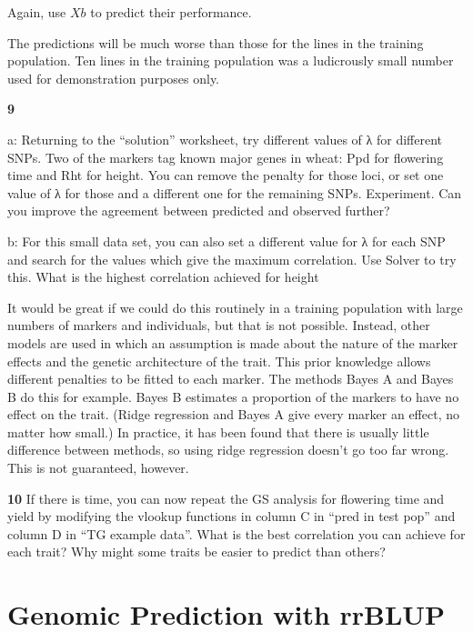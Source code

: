 \documentclass[
]{book}
\makeatletter
\newenvironment{kframe}{%
\medskip{}
\setlength{\fboxsep}{.8em}
 \def\at@end@of@kframe{}%
 \ifinner\ifhmode%
  \def\at@end@of@kframe{\end{minipage}}%
  \begin{minipage}{\columnwidth}%
 \fi\fi%
 \def\FrameCommand##1{\hskip\@totalleftmargin \hskip-\fboxsep
 \colorbox{shadecolor}{##1}\hskip-\fboxsep
     \hskip-\linewidth \hskip-\@totalleftmargin \hskip\columnwidth}%
 \MakeFramed {\advance\hsize-\width
   \@totalleftmargin\z@ \linewidth\hsize
   \@setminipage}}%
 {\par\unskip\endMakeFramed%
 \at@end@of@kframe}
\newenvironment{rmdblock}[1]
  {
  \begin{itemize}
  \renewcommand{\labelitemi}{
    \raisebox{-.7\height}[0pt][0pt]{
      {\setkeys{Gin}{width=3em,keepaspectratio}\texttt{[image: images/\#1]}}
    }
  }
  \setlength{\fboxsep}{1em}
  \begin{kframe}
  \item
  }
  {
  \end{kframe}
  \end{itemize}
  }
\newenvironment{rmdquiz}
  {\begin{rmdblock}{quiz}}
  {\end{rmdblock}}
\makeatother
\begin{document}
Again, use \(Xb\) to predict their performance.

The predictions will be much worse than those for the lines in the training population. Ten lines in the training population was a ludicrously small number used for demonstration purposes only.

\begin{rmdquiz}
\textbf{9}

a: Returning to the ``solution'' worksheet, try different values of λ for different SNPs. Two of the markers tag known major genes in wheat: Ppd for flowering time and Rht for height. You can remove the penalty for those loci, or set one value of λ for those and a different one for the remaining SNPs. Experiment. Can you improve the agreement between predicted and observed further?

b: For this small data set, you can also set a different value for λ for each SNP and search for the values which give the maximum correlation. Use Solver to try this. What is the highest correlation achieved for height
\end{rmdquiz}

It would be great if we could do this routinely in a training population with large numbers of markers and individuals, but that is not possible. Instead, other models are used in which an assumption is made about the nature of the marker effects and the genetic architecture of the trait. This prior knowledge allows different penalties to be fitted to each marker. The methods Bayes A and Bayes B do this for example. Bayes B estimates a proportion of the markers to have no effect on the trait. (Ridge regression and Bayes A give every marker an effect, no matter how small.) In practice, it has been found that there is usually little difference between methods, so using ridge regression doesn't go too far wrong. This is not guaranteed, however.

\begin{rmdquiz}
\textbf{10}
If there is time, you can now repeat the GS analysis for flowering time and yield by modifying the vlookup functions in column C in ``pred in test pop'' and column D in ``TG example data''. What is the best correlation you can achieve for each trait? Why might some traits be easier to predict than others?
\end{rmdquiz}

\hypertarget{genomic-prediction-with-rrblup}{%
\section{Genomic Prediction with rrBLUP}\label{genomic-prediction-with-rrblup}}
\end{document}
